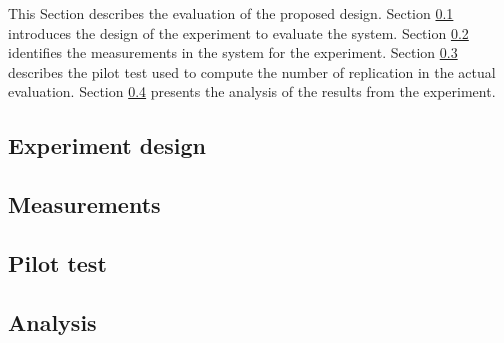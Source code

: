 This Section describes the evaluation of the proposed design.
Section \ref{sec:design} introduces the design of the experiment to evaluate the system. 
Section \ref{sec:measurements} identifies the measurements in the system for the experiment.
Section \ref{sec:pilot_test} describes the pilot test used to compute the number of replication in the actual evaluation. 
Section \ref{sec:analysis} presents the analysis of the results from the experiment. 

\subsection{Experiment design}
\label{sec:design}

\subsection{Measurements}
\label{sec:measurements}

\subsection{Pilot test}
\label{sec:pilot_test}

\subsection{Analysis}
\label{sec:analysis}
